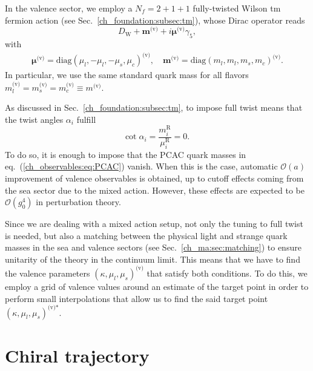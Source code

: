 In the valence sector, we employ a $N_f=2+1+1$ fully-twisted Wilson tm fermion action (see Sec.~\ref{ch_foundation:subsec:tm}), whose Dirac operator reads
\begin{equation}
D_{\textrm{W}}+\boldsymbol{m}^{\textrm{(v)}}+i\boldsymbol{\mu}^{\textrm{(v)}}\gamma_5,
\end{equation}
with 
\begin{gather}
\boldsymbol{\mu}^{\textrm{(v)}}={\textrm{diag}}(\mu_l,-\mu_l,-\mu_s,\mu_c)^{\textrm{(v)}}, \quad
\boldsymbol{m}^{\textrm{(v)}}={\textrm{diag}}(m_l,m_l,m_s,m_c)^{\textrm{(v)}}.
\end{gather}
In particular, we use the same standard quark mass for all flavors $m_l^{\textrm{(v)}}=m_s^{\textrm{(v)}}=m_c^{\textrm{(v)}}\equiv m^{\textrm{(v)}}$.

As discussed in Sec.~\ref{ch_foundation:subsec:tm}, to impose full twist means that the twist angles $\alpha_i$ fulfill
\begin{equation}
{\textrm{cot}}\;\alpha_i=\frac{m_i^{\textrm{R}}}{\mu_i^{\textrm{R}}}=0.
\end{equation}
To do so, it is enough to impose that the PCAC quark masses in eq.~(\ref{ch_observables:eq:PCAC}) vanish. When this is the case, automatic $\mathcal{O}(a)$ improvement of valence observables is obtained, up to cutoff effects coming from the sea sector due to the mixed action. However, these effects are expected to be $\mathcal{O}(g_0^4)$ in perturbation theory.

Since we are dealing with a mixed action setup, not only the tuning to full twist is needed, but also a matching between the physical light and strange quark masses in the sea and valence sectors (see Sec.~\ref{ch_ma:sec:matching}) to ensure unitarity of the theory in the continuum limit. This means that we have to find the valence parameters $\left(\kappa,\mu_l,\mu_s\right)^{\textrm{(v)}}$ that satisfy both conditions. To do this, we employ a grid of valence values around an estimate of the target point in order to perform small interpolations that allow us to find the said target point $\left(\kappa,\mu_l,\mu_s\right)^{\textrm{(v)*}}$.


\section{Chiral trajectory}
\label{ch_ma:sec:chiral_traj}

